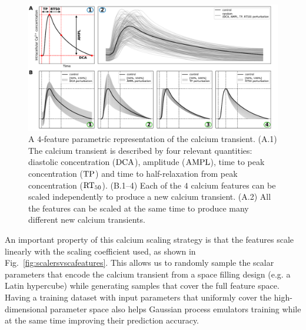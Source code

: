 \begin{figure}[!ht]
    \myfloatalign
    \includegraphics[width=\textwidth]{figures/chapter06/ca_biomarkers_and_scaling_explained_with_labels.pdf}
    \caption{A $4$-feature parametric representation of the calcium transient. (A.1) The calcium transient is described by four relevant quantities: diastolic concentration ($\textrm{DCA}$), amplitude ($\textrm{AMPL}$), time to peak concentration ($\textrm{TP}$) and time to half-relaxation from peak concentration ($\textrm{RT}_{50}$). (B.1--4) Each of the $4$ calcium features can be scaled independently to produce a new calcium transient. (A.2) All the features can be scaled at the same time to produce many different new calcium transients.}
    \label{fig:algintopractice}
\end{figure}

\vspace{0.2cm}
An important property of this calcium scaling strategy is that the features scale linearly with the scaling coefficient used, as shown in Fig.~\ref{fig:scalersvscafeatures}. This allows us to randomly sample the scalar parameters that encode the calcium transient from a space filling design (e.g. a Latin hypercube) while generating samples that cover the full feature space. Having a training dataset with input parameters that uniformly cover the high-dimensional parameter space also helps Gaussian process emulators training while at the same time improving their prediction accuracy.

